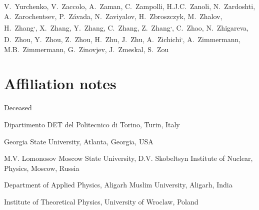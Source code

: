 \begin{flushleft}
V.~Yurchenko\And, 
V.~Zaccolo\And, 
A.~Zaman\And, 
C.~Zampolli\And, 
H.J.C.~Zanoli\And, 
N.~Zardoshti\And, 
A.~Zarochentsev\And, 
P.~Z\'{a}vada\And, 
N.~Zaviyalov\And, 
H.~Zbroszczyk\And, 
M.~Zhalov\And, 
H.~Zhang\textsuperscript{,}\And, 
X.~Zhang\And, 
Y.~Zhang\And, 
C.~Zhang\And, 
Z.~Zhang\textsuperscript{,}\And, 
C.~Zhao\And, 
N.~Zhigareva\And, 
D.~Zhou\And, 
Y.~Zhou\And, 
Z.~Zhou\And, 
H.~Zhu\And, 
J.~Zhu\And, 
A.~Zichichi\textsuperscript{,}\And, 
A.~Zimmermann\And, 
M.B.~Zimmermann\And, 
G.~Zinovjev\And, 
J.~Zmeskal\And, 
S.~Zou\And
\renewcommand\labelenumi{\textsuperscript{\theenumi}~}

\section*{Affiliation notes}
\renewcommand\theenumi{\roman{enumi}}
\begin{Authlist}
\item {}Deceased
\item {}Dipartimento DET del Politecnico di Torino, Turin, Italy
\item {}Georgia State University, Atlanta, Georgia, USA
\item {}M.V. Lomonosov Moscow State University, D.V. Skobeltsyn Institute of Nuclear, Physics, Moscow, Russia
\item {}Department of Applied Physics, Aligarh Muslim University, Aligarh, India
\item {}Institute of Theoretical Physics, University of Wroclaw, Poland
\end{Authlist}


\end{flushleft}
